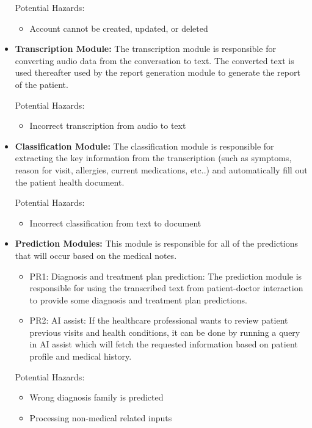 \documentclass{article}
\begin{document}
\begin{itemize}
    Potential Hazards:
    \begin{itemize}
        \item Account cannot be created, updated, or deleted
    \end{itemize}
    
    \item \textbf{Transcription Module:}
    The transcription module is responsible for converting audio data from the conversation to text. The converted text is used thereafter used by the report generation module to generate the report of the patient.

    Potential Hazards:
    \begin{itemize}
        \item Incorrect transcription from audio to text
    \end{itemize}

    \item \textbf{Classification Module:}
    The classification module is responsible for extracting the key information from the transcription (such as symptoms, reason for visit, allergies, current medications, etc..) and automatically fill out the patient health document.

    Potential Hazards:
    \begin{itemize}
        \item Incorrect classification from text to document
    \end{itemize}

    \item \textbf{Prediction Modules:}
    This module is responsible for all of the predictions that will occur based on the medical notes.

    \begin{itemize}
        \item PR1: Diagnosis and treatment plan prediction: The prediction module is responsible for using the transcribed text from patient-doctor interaction to provide some diagnosis and treatment plan predictions.
        \item PR2: AI assist: If the healthcare professional wants to review patient previous visits and health conditions, it can be done by running a query in AI assist which will fetch the requested information based on patient profile and medical history.  
    \end{itemize}
    
    Potential Hazards:
    \begin{itemize}
        \item Wrong diagnosis family is predicted
        \item Processing non-medical related inputs
    \end{itemize}
    
\end{itemize}
\end{document}
